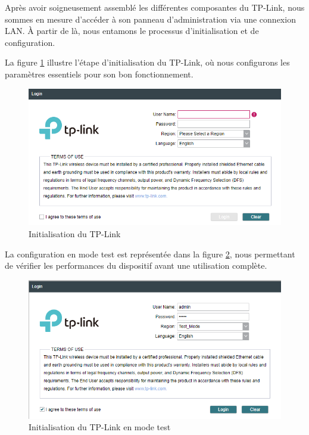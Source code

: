 Après avoir soigneusement assemblé les différentes composantes du TP-Link, nous sommes en mesure d'accéder à son panneau d'administration via une connexion LAN. À partir de là, nous entamons le processus d'initialisation et de configuration.

La figure \ref{Chap2.3.5} illustre l'étape d'initialisation du TP-Link, où nous configurons  les paramètres essentiels pour son bon fonctionnement.

\begin{figure}[H]
\centering
\includegraphics[width=15cm]{Images/tplink3-2.png}
\caption{Initialisation du TP-Link}
\label{Chap2.3.5}
\end{figure}

La configuration en mode test est représentée dans la figure \ref{Chap2.3.6}, nous permettant de vérifier les performances du dispositif avant une utilisation complète.

\begin{figure}[H]
\centering
\includegraphics[width=15cm]{Images/tplink33-2.png}
\caption{Initialisation du TP-Link en mode test}
\label{Chap2.3.6}
\end{figure}

